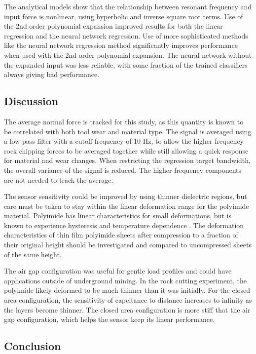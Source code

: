 The analytical models show that the relationship between resonant frequency and input force
is nonlinear, using hyperbolic and inverse square root terms.
Use of the 2nd order polynomial expansion improved results for both 
the linear regression and the neural network regression. 
Use of more sophisticated methods like the neural network regression method
significantly improves performance when used with the 2nd order polynomial expansion.
The neural network without the expanded input was less reliable, with some fraction of the 
trained classifiers always giving bad performance.

\subsection{Discussion}

The average normal force is tracked for this study, 
as this quantity is known to be correlated with both tool wear and material type.
The signal is averaged using a low pass filter with a cutoff frequency of 10 Hz,
to allow the higher frequency rock chipping forces to be averaged together while
still allowing a quick response for material and wear changes.
When restricting the regression target bandwidth, the overall variance of the signal is reduced. 
The higher frequency components are not needed to track the average.

The sensor sensitivity could be improved by using thinner dielectric regions, but care must be taken 
to stay within the linear deformation range for the polyimide material.
Polyimide has linear characteristics for small deformations, but is known
to experience hysteresis and temperature dependence \cite{ZHANG2012, CHO19971615, 7365229}.
The deformation characteristics of thin film polyimide sheets after compression
to a fraction of their original height should be investigated and compared to 
uncompressed sheets of the same height.

The air gap configuration was useful for gentle load profiles and could have applications 
outside of underground mining.
In the rock cutting experiment, the polyimide likely deformed to be much thinner than it was initially.
For the closed area configuration, 
the sensitivity of capcitance to distance increases to infinity as the layers
become thinner. 
The closed area configuration is more stiff that the air gap configuration,
which helps the sensor keep its linear performance.

\subsection{Conclusion}


